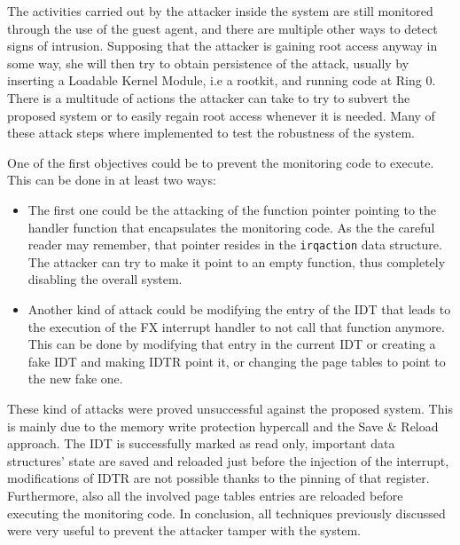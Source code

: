 The activities carried out by the attacker inside the system are still monitored through the use of the guest agent, and there are multiple other ways to detect signs of intrusion. Supposing that the attacker is gaining root access anyway in some way, she will then try to obtain persistence of the attack, usually by inserting a Loadable Kernel Module, i.e a rootkit, and running code at Ring 0. There is a multitude of actions the attacker can take to try to subvert the proposed system or to easily regain root access whenever it is needed. Many of these attack steps where implemented to test the robustness of the system. 
\par
One of the first objectives could be to prevent the monitoring code to execute. This can be done in at least two ways: 
\begin{itemize}
    \item The first one could be the attacking of the function pointer pointing to the handler function that encapsulates the monitoring code. As the the careful reader may remember, that pointer resides in the \texttt{irqaction} data structure. The attacker can try to make it point to an empty function, thus completely disabling the overall system. 
    \item Another kind of attack could be modifying the entry of the IDT that leads to the execution of the FX interrupt handler to not call that function anymore. This can be done by modifying that entry in the current IDT or creating a fake IDT and making IDTR point it, or changing the page tables to point to the new fake one.
\end{itemize}
These kind of attacks were proved unsuccessful against the proposed system. This is mainly due to the memory write protection hypercall and the Save \& Reload approach. The IDT is successfully marked as read only, important data structures' state are saved and reloaded just before the injection of the interrupt, modifications of IDTR are not possible thanks to the pinning of that register. Furthermore, also all the involved page tables entries are reloaded before executing the monitoring code. In conclusion, all techniques previously discussed were very useful to prevent the attacker tamper with the system.  
\par
